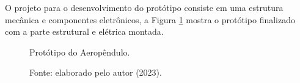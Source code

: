 O projeto para o desenvolvimento do protótipo consiste em uma estrutura mecânica e componentes eletrônicos, a Figura \ref{fig3:image_01} mostra o protótipo finalizado com a parte estrutural e elétrica montada.


\begin{figure}[!h]
	\centering
	\caption{Protótipo do Aeropêndulo.}
	\caption*{Fonte: elaborado pelo autor (2023).}
	\label{fig3:image_01}
\end{figure}
